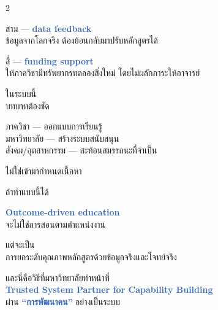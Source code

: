 \documentclass[10pt]{article}
\begin{document}
\begin{tcolorbox}[breakable,colback=panel,colframe=line,boxrule=0.5pt,arc=2mm,left=3mm,right=3mm,top=2mm,bottom=2mm]
\begin{multicols}{2}
\par สาม — \textbf{\textcolor{highlight}{data feedback}}\\ ข้อมูลจากโลกจริง ต้องย้อนกลับมาปรับหลักสูตรได้
\par สี่ — \textbf{\textcolor{highlight}{funding support}}\\ ให้ภาควิชามีทรัพยากรทดลองสิ่งใหม่ โดยไม่ผลักภาระให้อาจารย์
\par ในระบบนี้\\ บทบาทต้องชัด
\par ภาควิชา — ออกแบบการเรียนรู้\\ มหาวิทยาลัย — สร้างระบบสนับสนุน\\ สังคม/อุตสาหกรรม — สะท้อนสมรรถนะที่จำเป็น
\par ไม่ใช่เข้ามากำหนดเนื้อหา
\par ถ้าทำแบบนี้ได้
\par \textbf{\textcolor{highlight}{Outcome-driven education}}\\ จะไม่ใช่การสอนตามตำแหน่งงาน
\par แต่จะเป็น\\ การยกระดับคุณภาพหลักสูตรด้วยข้อมูลจริงและโจทย์จริง
\par และนี่คือวิธีที่มหาวิทยาลัยทำหน้าที่\\ \textbf{\textcolor{highlight}{Trusted System Partner for Capability Building}}\\ ผ่าน \textbf{\textcolor{highlight}{“การพัฒนาคน”}} อย่างเป็นระบบ
\end{multicols}
\end{tcolorbox}

\clearpage
\end{document}
